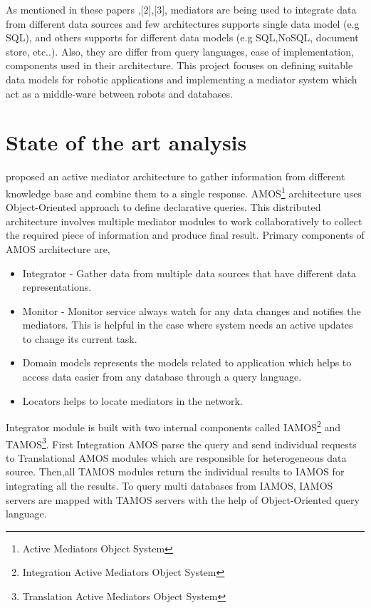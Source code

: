\documentclass[12pt]{article}
\begin{document}
As mentioned in these papers \cite{fahl1993amos},[2],[3], mediators are being used to integrate data from different data sources and few architectures supports single data model (e.g SQL), and others supports for different data models (e.g SQL,NoSQL, document store, etc..). Also, they are differ from query languages, ease of implementation, components used in their architecture. This project focuses on defining suitable data models for robotic applications and implementing a mediator system which act as a middle-ware between robots and databases. 

\section{State of the art analysis}

\citet{fahl1993amos} proposed an active mediator architecture to gather information from different knowledge base and combine them to a single response. AMOS\footnote{\label{amos}Active Mediators Object System} architecture uses Object-Oriented approach to define declarative queries. This distributed architecture involves multiple mediator modules to work collaboratively to collect the required piece of information and produce final result. Primary components of AMOS architecture are,
\begin{itemize}
	\item Integrator - Gather data from multiple data sources that have different data representations.
	\item Monitor - Monitor service always watch for any data changes and notifies the mediators. This is helpful in the case where system needs an active updates to change its current task.
	\item Domain models represents the models related to application which helps to access data easier from any database through a query language.
	\item Locators helps to locate mediators in the network.
\end{itemize}


Integrator module is built with two internal components called IAMOS\footnote{\label{amos}Integration Active Mediators Object System} and TAMOS\footnote{\label{amos}Translation Active Mediators Object System}. 
First Integration AMOS parse the query and send individual requests to Translational AMOS modules which are responsible for heterogeneous data source.
Then,all TAMOS modules return the individual results to IAMOS for integrating all the results. To query multi databases from IAMOS, IAMOS servers are mapped with TAMOS servers with the help of Object-Oriented query language.
\end{document}
